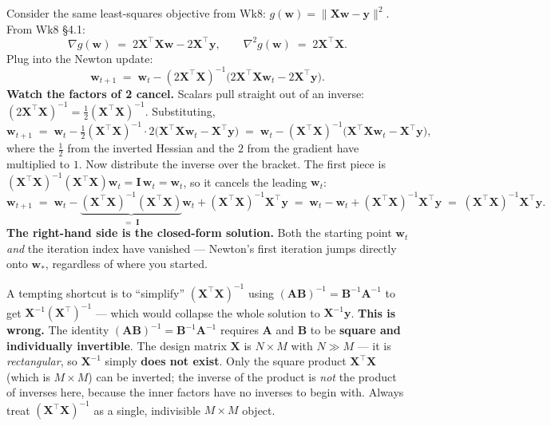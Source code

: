 \documentclass[11pt, a4paper]{article}
\begin{document}
Consider the same least-squares objective from Wk8: $g(\mathbf{w}) = \|\mathbf{X}\mathbf{w}-\mathbf{y}\|^2$. From Wk8 §4.1:
\[
\nabla g(\mathbf{w}) \;=\; 2\mathbf{X}^\top\mathbf{X}\mathbf{w} - 2\mathbf{X}^\top\mathbf{y}, \qquad
\nabla^2 g(\mathbf{w}) \;=\; 2\mathbf{X}^\top\mathbf{X}.
\]
Plug into the Newton update:
\[
\mathbf{w}_{t+1} \;=\; \mathbf{w}_t - (2\mathbf{X}^\top\mathbf{X})^{-1}\big(2\mathbf{X}^\top\mathbf{X}\mathbf{w}_t - 2\mathbf{X}^\top\mathbf{y}\big).
\]
\textbf{Watch the factors of 2 cancel.} Scalars pull straight out of an inverse: $(2\mathbf{X}^\top\mathbf{X})^{-1} = \tfrac{1}{2}(\mathbf{X}^\top\mathbf{X})^{-1}$. Substituting,
\[
\mathbf{w}_{t+1} \;=\; \mathbf{w}_t - \tfrac{1}{2}(\mathbf{X}^\top\mathbf{X})^{-1}\cdot 2\big(\mathbf{X}^\top\mathbf{X}\mathbf{w}_t - \mathbf{X}^\top\mathbf{y}\big)
\;=\; \mathbf{w}_t - (\mathbf{X}^\top\mathbf{X})^{-1}\big(\mathbf{X}^\top\mathbf{X}\mathbf{w}_t - \mathbf{X}^\top\mathbf{y}\big),
\]
where the $\tfrac{1}{2}$ from the inverted Hessian and the $2$ from the gradient have multiplied to $1$. Now distribute the inverse over the bracket. The first piece is $(\mathbf{X}^\top\mathbf{X})^{-1}(\mathbf{X}^\top\mathbf{X})\mathbf{w}_t = \mathbf{I}\,\mathbf{w}_t = \mathbf{w}_t$, so it cancels the leading $\mathbf{w}_t$:
\[
\mathbf{w}_{t+1} \;=\; \mathbf{w}_t - \underbrace{(\mathbf{X}^\top\mathbf{X})^{-1}(\mathbf{X}^\top\mathbf{X})}_{=\;\mathbf{I}}\mathbf{w}_t + (\mathbf{X}^\top\mathbf{X})^{-1}\mathbf{X}^\top\mathbf{y}
\;=\; \mathbf{w}_t - \mathbf{w}_t + (\mathbf{X}^\top\mathbf{X})^{-1}\mathbf{X}^\top\mathbf{y}
\;=\; (\mathbf{X}^\top\mathbf{X})^{-1}\mathbf{X}^\top\mathbf{y}.
\]
\textbf{The right-hand side is the closed-form solution.} Both the starting point $\mathbf{w}_t$ \emph{and} the iteration index have vanished — Newton's first iteration jumps directly onto $\mathbf{w}_*$, regardless of where you started.

\begin{pitfallbox}
A tempting shortcut is to ``simplify'' $(\mathbf{X}^\top\mathbf{X})^{-1}$ using $(\mathbf{A}\mathbf{B})^{-1} = \mathbf{B}^{-1}\mathbf{A}^{-1}$ to get $\mathbf{X}^{-1}(\mathbf{X}^\top)^{-1}$ — which would collapse the whole solution to $\mathbf{X}^{-1}\mathbf{y}$. \textbf{This is wrong.} The identity $(\mathbf{A}\mathbf{B})^{-1} = \mathbf{B}^{-1}\mathbf{A}^{-1}$ requires $\mathbf{A}$ and $\mathbf{B}$ to be \textbf{square and individually invertible}. The design matrix $\mathbf{X}$ is $N\times M$ with $N\gg M$ — it is \emph{rectangular}, so $\mathbf{X}^{-1}$ simply \textbf{does not exist}. Only the square product $\mathbf{X}^\top\mathbf{X}$ (which is $M\times M$) can be inverted; the inverse of the product is \emph{not} the product of inverses here, because the inner factors have no inverses to begin with. Always treat $(\mathbf{X}^\top\mathbf{X})^{-1}$ as a single, indivisible $M\times M$ object.
\end{pitfallbox}
\end{document}
